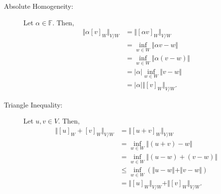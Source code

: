 \documentclass[10pt]{extarticle}
\begin{document}
\begin{enumerate}[(i)]
\begin{description}
          \item[Absolute Homogeneity:] Let $\alpha\in \mathbb{F}$. Then,
            \begin{align*}
              \Vert \alpha[v]_{W}\Vert_{V/W} &= \Vert [\alpha v]_{W}\Vert_{V/W}\\
                                            &= \inf_{w\in W}\Vert \alpha v - w\Vert\\
                                            &= \inf_{w\in W}\Vert \alpha (v-w)\Vert \tag*{$W$ subspace}\\
                                            &= |\alpha|\inf_{w\in W}\Vert v-w\Vert\\
                                            &= |\alpha|\Vert [v]_{W}\Vert_{V/W}.
            \end{align*}
          \item[Triangle Inequality:] Let $u,v\in V$. Then,
            \begin{align*}
              \Vert [u]_{W} + [v]_{W}\Vert_{V/W} &= \Vert [u+v]_{W}\Vert_{V/W}\\
                                                 &= \inf_{w\in W}\Vert (u+v) - w \Vert\\
                                                 &= \inf_{w\in W}\Vert (u-w) + (v-w)\Vert \tag*{$W$ subspace}\\
                                                 &\leq \inf_{w\in W}\left(\Vert u-w\Vert + \Vert v-w\Vert\right)\\
                                                 &= \Vert[u]_{W}\Vert_{V/W} + \Vert[v]_{W}\Vert_{V/W}.
            \end{align*}
        \end{description}
    \end{enumerate}
\end{document}
